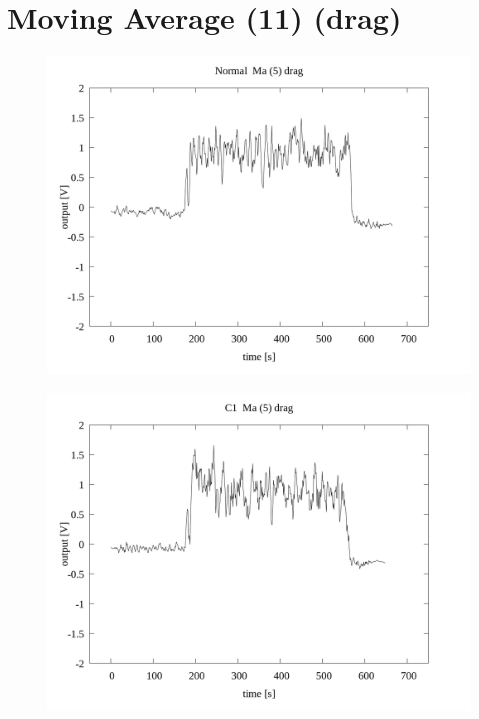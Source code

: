 \documentclass[a4paper]{jsarticle}
\author{}
\title{}
\date{}
\begin{document}
\section{Moving Average (11) (drag)}

\begin{figure}[htbp]
    \footnotesize
    \begin{center}
        \includegraphics[width=140mm]{../../../../33_result/210806/moving_average/5/drag/01/Normal_ma(5)_drag_01.png}
    \end{center}
\end{figure}

\begin{figure}[htbp]
    \footnotesize
    \begin{center}
        \includegraphics[width=140mm]{../../../../33_result/210806/moving_average/5/drag/01/C1_ma(5)_drag_01.png}
    \end{center}
\end{figure}
\end{document}
